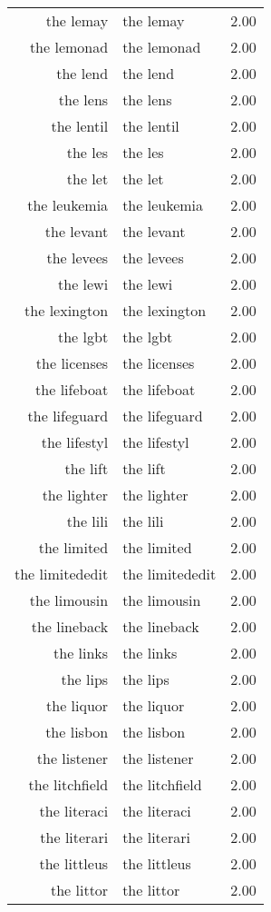 \begin{table}[ht]
\begin{tabular}{rlr}
  the lemay & the lemay & 2.00 \\ 
  the lemonad & the lemonad & 2.00 \\ 
  the lend & the lend & 2.00 \\ 
  the lens & the lens & 2.00 \\ 
  the lentil & the lentil & 2.00 \\ 
  the les & the les & 2.00 \\ 
  the let & the let & 2.00 \\ 
  the leukemia & the leukemia & 2.00 \\ 
  the levant & the levant & 2.00 \\ 
  the levees & the levees & 2.00 \\ 
  the lewi & the lewi & 2.00 \\ 
  the lexington & the lexington & 2.00 \\ 
  the lgbt & the lgbt & 2.00 \\ 
  the licenses & the licenses & 2.00 \\ 
  the lifeboat & the lifeboat & 2.00 \\ 
  the lifeguard & the lifeguard & 2.00 \\ 
  the lifestyl & the lifestyl & 2.00 \\ 
  the lift & the lift & 2.00 \\ 
  the lighter & the lighter & 2.00 \\ 
  the lili & the lili & 2.00 \\ 
  the limited & the limited & 2.00 \\ 
  the limitededit & the limitededit & 2.00 \\ 
  the limousin & the limousin & 2.00 \\ 
  the lineback & the lineback & 2.00 \\ 
  the links & the links & 2.00 \\ 
  the lips & the lips & 2.00 \\ 
  the liquor & the liquor & 2.00 \\ 
  the lisbon & the lisbon & 2.00 \\ 
  the listener & the listener & 2.00 \\ 
  the litchfield & the litchfield & 2.00 \\ 
  the literaci & the literaci & 2.00 \\ 
  the literari & the literari & 2.00 \\ 
  the littleus & the littleus & 2.00 \\ 
  the littor & the littor & 2.00 \\ 

\end{tabular}
\end{table}
